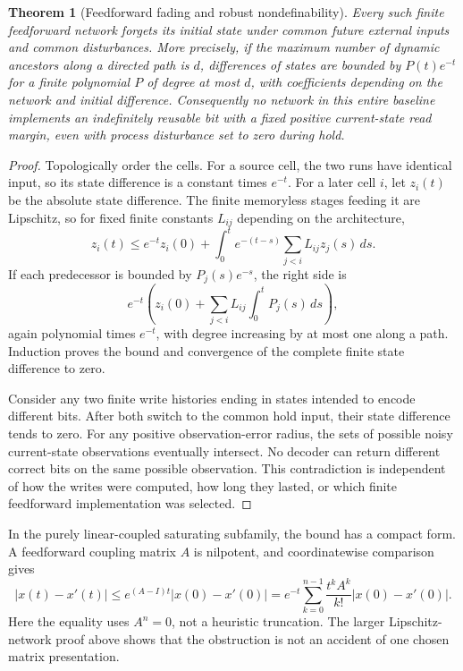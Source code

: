 \documentclass[11pt]{article}
\newtheorem{theorem}{Theorem}[section]
\theoremstyle{definition}
\theoremstyle{remark}
\begin{document}
\begin{theorem}[Feedforward fading and robust nondefinability]\label{fb:thm:feedforward}
Every such finite feedforward network forgets its initial state under common future external inputs and common disturbances. More precisely, if the maximum number of dynamic ancestors along a directed path is $d$, differences of states are bounded by $P(t)e^{-t}$ for a finite polynomial $P$ of degree at most $d$, with coefficients depending on the network and initial difference. Consequently no network in this entire baseline implements an indefinitely reusable bit with a fixed positive current-state read margin, even with process disturbance set to zero during hold.
\end{theorem}
\begin{proof}
Topologically order the cells. For a source cell, the two runs have identical input, so its state difference is a constant times $e^{-t}$. For a later cell $i$, let $z_i(t)$ be the absolute state difference. The finite memoryless stages feeding it are Lipschitz, so for fixed finite constants $L_{ij}$ depending on the architecture,
\[
 z_i(t)\leq e^{-t}z_i(0)
       +\int_0^t e^{-(t-s)}\sum_{j<i}L_{ij}z_j(s)\,ds.
\]
If each predecessor is bounded by $P_j(s)e^{-s}$, the right side is
\[
 e^{-t}\left(z_i(0)+\sum_{j<i}L_{ij}\int_0^t P_j(s)\,ds\right),
\]
again polynomial times $e^{-t}$, with degree increasing by at most one along a path. Induction proves the bound and convergence of the complete finite state difference to zero.

Consider any two finite write histories ending in states intended to encode different bits. After both switch to the common hold input, their state difference tends to zero. For any positive observation-error radius, the sets of possible noisy current-state observations eventually intersect. No decoder can return different correct bits on the same possible observation. This contradiction is independent of how the writes were computed, how long they lasted, or which finite feedforward implementation was selected.
\end{proof}

In the purely linear-coupled saturating subfamily, the bound has a compact form. A feedforward coupling matrix $A$ is nilpotent, and coordinatewise comparison gives
\[
 |x(t)-x'(t)|\leq e^{(A-I)t}|x(0)-x'(0)|
 =e^{-t}\sum_{k=0}^{n-1}\frac{t^k A^k}{k!}|x(0)-x'(0)|.
\]
Here the equality uses $A^n=0$, not a heuristic truncation. The larger Lipschitz-network proof above shows that the obstruction is not an accident of one chosen matrix presentation.
\end{document}
